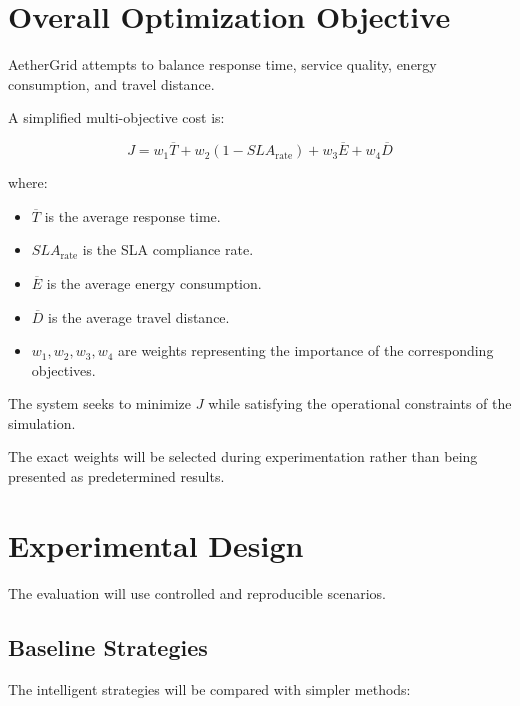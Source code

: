 \documentclass[12pt,a4paper]{article}
\begin{document}
\section{Overall Optimization Objective}

AetherGrid attempts to balance response time, service quality,
energy consumption, and travel distance.

A simplified multi-objective cost is:

\begin{equation}
    J
    =
    w_1\overline{T}
    +
    w_2(1-SLA_{\mathrm{rate}})
    +
    w_3\overline{E}
    +
    w_4\overline{D}
    \label{eq:overall}
\end{equation}

where:

\begin{itemize}
    \item $\overline{T}$ is the average response time.
    \item $SLA_{\mathrm{rate}}$ is the SLA compliance rate.
    \item $\overline{E}$ is the average energy consumption.
    \item $\overline{D}$ is the average travel distance.
    \item $w_1,w_2,w_3,w_4$ are weights representing the importance
    of the corresponding objectives.
\end{itemize}

The system seeks to minimize $J$ while satisfying the operational
constraints of the simulation.

The exact weights will be selected during experimentation rather than
being presented as predetermined results.





\section{Experimental Design}

The evaluation will use controlled and reproducible scenarios.

\subsection{Baseline Strategies}

The intelligent strategies will be compared with simpler methods:
\end{document}
